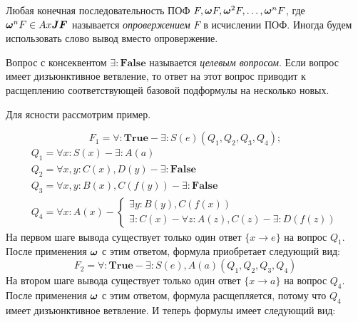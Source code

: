 %
Любая конечная последовательность ПОФ $F, \boldsymbol{\omega} F, \boldsymbol{\omega}^2 F,\ldots,\boldsymbol{\omega}^n F$, где $\boldsymbol{\omega}^n F \in Ax\boldsymbol{JF}$ называется {\em опровержением} $F$ в исчислении ПОФ. Иногда будем использовать слово вывод вместо опровержение.

Вопрос с консеквентом $\exists:\boldsymbol{False}$ называется {\em целевым вопросом}. Если вопрос имеет дизъюнктивное ветвление, то ответ на этот вопрос приводит к расщеплению соответствующей базовой подформулы на несколько новых. 

Для ясности рассмотрим пример.

\begin{example}\label{proofexample}


\begin{equation*}\label{ex:f1}
	F_1 = \forall\colon\boldsymbol{True} - \exists\colon S(e)(Q_1,Q_2,Q_3,Q_4);
\end{equation*}
\begin{equation*}
	\begin{array}{l}
	Q_1 = \forall x\colon S(x) - \exists\colon A(a) \\
	Q_2 = \forall x,y\colon C(x),D(y) - \exists\colon\boldsymbol{False} \\
	Q_3 = \forall x,y\colon B(x),C(f(y)) - \exists\colon\boldsymbol{False} \\
	Q_4 =
	\forall x\colon A(x) - 
	\left\lbrace
	\begin{array}{l}
		\exists y\colon B(y),C(f(x)) \\
		\exists \colon C(x) - \forall z\colon A(z),C(z) - \exists\colon D(f(z))
	\end{array}\right.
	\end{array}
\end{equation*}
На первом шаге вывода существует только один ответ $\{x \rightarrow e\}$ на вопрос $Q_1$. После применения $\boldsymbol{\omega}$ с этим ответом, формула приобретает следующий вид:
\begin{equation*}\label{ex:f2}
	F_2 = \forall\colon\boldsymbol{True} - \exists\colon S(e),A(a)(Q_1,Q_2,Q_3,Q_4)
\end{equation*}
На втором шаге вывода существует только один ответ $\{x \rightarrow a\}$ на вопрос $Q_4$. После применения $\boldsymbol{\omega}$ с этим ответом, формула расщепляется, потому что $Q_4$ имеет дизъюнктивное ветвление. И теперь формулы имеет следующий вид: 


\end{example}

